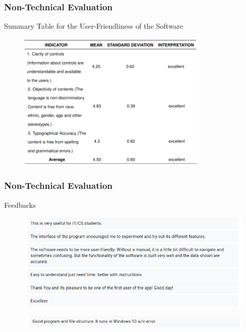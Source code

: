 \documentclass[handout]{beamer}
\begin{document}
\begin{frame}
	\frametitle{Non-Technical Evaluation}
	\begin{block}{Summary Table for the User-Friendliness of the Software}
		\begin{figure}
			\includegraphics[width=0.8\textwidth]{figures/res_non_tech_uf.png}
		\end{figure}
	\end{block}
\end{frame}

\begin{frame}
	\frametitle{Non-Technical Evaluation}
	\begin{block}{Feedbacks}
		\begin{figure}
			\includegraphics[width=\textwidth]{figures/feedbacks/nontech1.png}
		\end{figure}
		\begin{figure}
			\includegraphics[width=\textwidth]{figures/feedbacks/nontech2.png}
		\end{figure}
	\end{block}
\end{frame}
\end{document}

